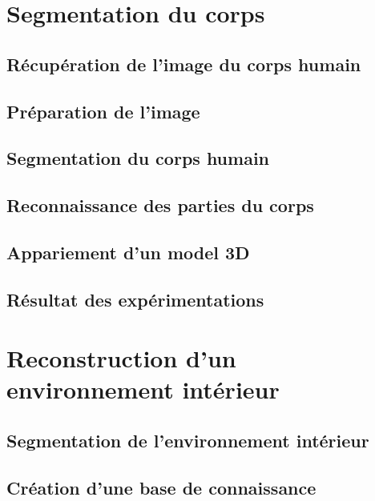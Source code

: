 \documentclass[a4paper,11pt]{article}
\begin{document}
\section{Segmentation du corps}
\subsection{Récupération de l'image du corps humain}
\subsection{Préparation de l'image}
\subsection{Segmentation du corps humain}
\subsection{Reconnaissance des parties du corps}
\subsection{Appariement d'un model 3D}
\subsection{Résultat des expérimentations}

\section{Reconstruction d'un environnement intérieur}
\subsection{Segmentation de l'environnement intérieur}
\subsection{Création d'une base de connaissance}
\end{document}
